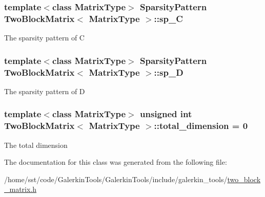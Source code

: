 \subsubsection[{\texorpdfstring{sp\+\_\+C}{sp_C}}]{\setlength{\rightskip}{0pt plus 5cm}template$<$class Matrix\+Type$>$ {\bf Sparsity\+Pattern} {\bf Two\+Block\+Matrix}$<$ Matrix\+Type $>$\+::sp\+\_\+C\hspace{0.3cm}{\ttfamily [protected]}}\hypertarget{class_two_block_matrix_a45d6e534ad775577c86e9ac9a116014e}{}\label{class_two_block_matrix_a45d6e534ad775577c86e9ac9a116014e}
The sparsity pattern of C 
\subsubsection[{\texorpdfstring{sp\+\_\+D}{sp_D}}]{\setlength{\rightskip}{0pt plus 5cm}template$<$class Matrix\+Type$>$ {\bf Sparsity\+Pattern} {\bf Two\+Block\+Matrix}$<$ Matrix\+Type $>$\+::sp\+\_\+D\hspace{0.3cm}{\ttfamily [protected]}}\hypertarget{class_two_block_matrix_adb1833352096be79279134b218659665}{}\label{class_two_block_matrix_adb1833352096be79279134b218659665}
The sparsity pattern of D 
\subsubsection[{\texorpdfstring{total\+\_\+dimension}{total_dimension}}]{\setlength{\rightskip}{0pt plus 5cm}template$<$class Matrix\+Type$>$ unsigned int {\bf Two\+Block\+Matrix}$<$ Matrix\+Type $>$\+::total\+\_\+dimension = 0\hspace{0.3cm}{\ttfamily [protected]}}\hypertarget{class_two_block_matrix_a7d63b4c4c1e499c9f9913444dc5fd6b6}{}\label{class_two_block_matrix_a7d63b4c4c1e499c9f9913444dc5fd6b6}
The total dimension 

The documentation for this class was generated from the following file\+:\begin{DoxyCompactItemize}
\item 
/home/sst/code/\+Galerkin\+Tools/\+Galerkin\+Tools/include/galerkin\+\_\+tools/\hyperlink{two__block__matrix_8h}{two\+\_\+block\+\_\+matrix.\+h}\end{DoxyCompactItemize}
